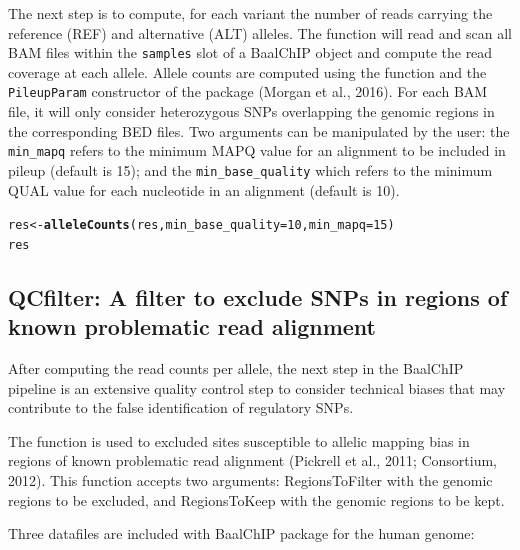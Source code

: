 \documentclass{article}\usepackage[]{graphicx}\usepackage[usenames,dvipsnames]{color}
\makeatletter
\newcommand{\hlnum}[1]{\textcolor[rgb]{0.686,0.059,0.569}{#1}}%
\newcommand{\hlstd}[1]{\textcolor[rgb]{0.345,0.345,0.345}{#1}}%
\newcommand{\hlkwb}[1]{\textcolor[rgb]{0.69,0.353,0.396}{#1}}%
\newcommand{\hlkwc}[1]{\textcolor[rgb]{0.333,0.667,0.333}{#1}}%
\newcommand{\hlkwd}[1]{\textcolor[rgb]{0.737,0.353,0.396}{\textbf{#1}}}%
\newenvironment{kframe}{%
 \def\at@end@of@kframe{}%
 \ifinner\ifhmode%
  \def\at@end@of@kframe{\end{minipage}}%
  \begin{minipage}{\columnwidth}%
 \fi\fi%
 \def\FrameCommand##1{\hskip\@totalleftmargin \hskip-\fboxsep
 \colorbox{shadecolor}{##1}\hskip-\fboxsep
     \hskip-\linewidth \hskip-\@totalleftmargin \hskip\columnwidth}%
 \MakeFramed {\advance\hsize-\width
   \@totalleftmargin\z@ \linewidth\hsize
   \@setminipage}}%
 {\par\unskip\endMakeFramed%
 \at@end@of@kframe}
\newenvironment{knitrout}{}{} %
\makeatother
\begin{document}
The next step is to compute, for each variant the number of reads carrying the reference (REF) and alternative (ALT) alleles. The  function will read and scan all BAM files  within the \texttt{samples} slot of a BaalChIP object and compute the read coverage at each allele. Allele counts are computed using the  function and the \texttt{PileupParam} constructor of the  package (Morgan et al., 2016). 
For each BAM file, it will only consider heterozygous SNPs overlapping the genomic regions in the 
corresponding BED files. Two arguments can be manipulated by the user: the \texttt{min\_mapq} refers to the minimum \textquotedbl{}MAPQ\textquotedbl{} value for an alignment to be included in pileup (default is 15); and the \texttt{min\_base\_quality} which refers to the minimum \textquotedbl{}QUAL\textquotedbl{} value for each nucleotide in an alignment (default is 10).

\begin{knitrout}
\color{fgcolor}\begin{kframe}
\begin{alltt}
\hlstd{res} \hlkwb{<-} \hlkwd{alleleCounts}\hlstd{(res,} \hlkwc{min_base_quality}\hlstd{=}\hlnum{10}\hlstd{,} \hlkwc{min_mapq}\hlstd{=}\hlnum{15}\hlstd{)}
\hlstd{res}
\end{alltt}
\end{kframe}
\end{knitrout}


\subsection{QCfilter: A filter to exclude SNPs in regions of known problematic read alignment}

After computing the read counts per allele, the next step in the BaalChIP pipeline is an extensive quality control step to consider technical biases that may contribute to the false identification of regulatory SNPs.

The function  is used to excluded sites susceptible to allelic mapping bias in regions of known problematic read alignment (Pickrell et al., 2011; Consortium, 2012). This function accepts two arguments: \textquotedbl{}RegionsToFilter\textquotedbl{} with the genomic regions to be excluded, and \textquotedbl{}RegionsToKeep\textquotedbl{} with the genomic regions to be kept. 

Three datafiles are included with BaalChIP package for the human genome: 
\end{document}
